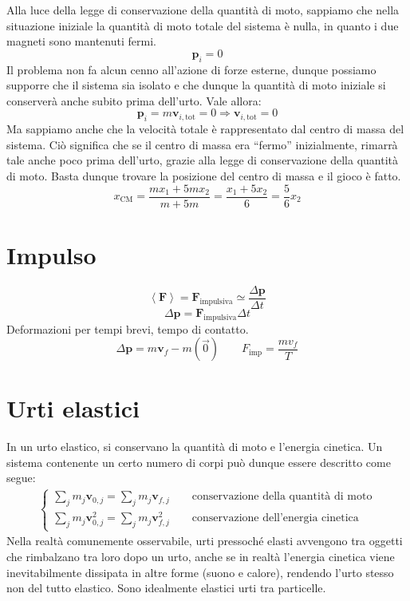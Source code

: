Alla luce della legge di conservazione della quantità di moto, sappiamo
che nella situazione iniziale la quantità di moto totale del sistema è
nulla, in quanto i due magneti sono mantenuti fermi.
\[ \mathbf{p}_i = 0 \]
Il problema non fa alcun cenno all'azione di forze esterne, dunque possiamo
supporre che il sistema sia isolato e che dunque la quantità di moto
iniziale si conserverà anche subito prima dell'urto. Vale allora:
\[ \mathbf{p}_i = m\mathbf{v}_{i,\text{tot}} = 0 \Rightarrow \mathbf{v}_{i,\text{tot}} = 0 \]
Ma sappiamo anche che la velocità totale è rappresentato dal centro di massa
del sistema. Ciò significa che se il centro di massa era ``fermo''
inizialmente, rimarrà tale anche poco prima dell'urto, grazie alla legge
di conservazione della quantità di moto. Basta dunque trovare la posizione
del centro di massa e il gioco è fatto.
\[ x_\text{CM} = \frac{mx_1 + 5mx_2}{m + 5m} = \frac{x_1 + 5x_2}{6} = \frac{5}{6}x_2 \]


\section{Impulso}
\[ \left\langle \mathbf{F} \right\rangle = \mathbf{F}_\text{impulsiva} \simeq \frac{\Delta\mathbf{p}}{\Delta t} \]
\[ \Delta\mathbf{p} = \mathbf{F}_\text{impulsiva}\Delta t \]
Deformazioni per tempi brevi, tempo di contatto.
\[ \Delta\mathbf{p} = m\mathbf{v}_f - m(\overrightarrow{0}) \qquad F_\text{imp} = \frac{mv_f}{T} \]


\section{Urti elastici}
In un urto elastico, si conservano la quantità di moto e l'energia cinetica.
Un sistema contenente un certo numero di corpi può dunque essere descritto come segue:
\begin{align*}
    \begin{cases}
        \sum_j m_j\mathbf{v}_{0,j} = \sum_j m_j\mathbf{v}_{f,j} \qquad \text{conservazione della quantità di moto}\\
        \sum_j m_j\mathbf{v}_{0,j}^2 = \sum_j m_j\mathbf{v}_{f,j}^2 \qquad \text{conservazione dell'energia cinetica}
    \end{cases}
\end{align*}
Nella realtà comunemente osservabile, urti pressoché elasti avvengono tra
oggetti che rimbalzano tra loro dopo un urto, anche se in realtà l'energia
cinetica viene inevitabilmente dissipata in altre forme (suono e calore), rendendo
l'urto stesso non del tutto elastico. Sono idealmente elastici urti tra
particelle.

